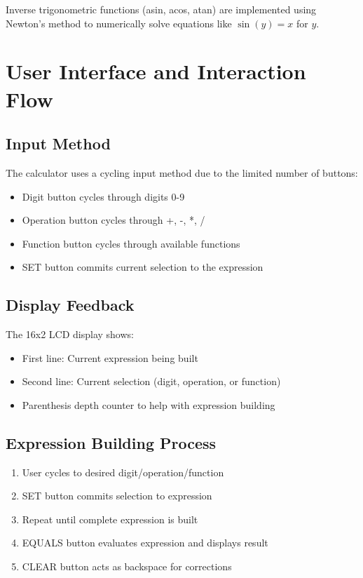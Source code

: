 \documentclass[12pt,a4paper]{article}
\begin{document}
Inverse trigonometric functions (asin, acos, atan) are implemented using Newton's method to numerically solve equations like $\sin(y) = x$ for $y$.

\section{User Interface and Interaction Flow}

\subsection{Input Method}

The calculator uses a cycling input method due to the limited number of buttons:
\begin{itemize}
    \item Digit button cycles through digits 0-9
    \item Operation button cycles through +, -, *, /
    \item Function button cycles through available functions
    \item SET button commits current selection to the expression
\end{itemize}

\subsection{Display Feedback}

The 16x2 LCD display shows:
\begin{itemize}
    \item First line: Current expression being built
    \item Second line: Current selection (digit, operation, or function)
    \item Parenthesis depth counter to help with expression building
\end{itemize}

\subsection{Expression Building Process}

\begin{enumerate}
    \item User cycles to desired digit/operation/function
    \item SET button commits selection to expression
    \item Repeat until complete expression is built
    \item EQUALS button evaluates expression and displays result
    \item CLEAR button acts as backspace for corrections
\end{enumerate}
\end{document}
